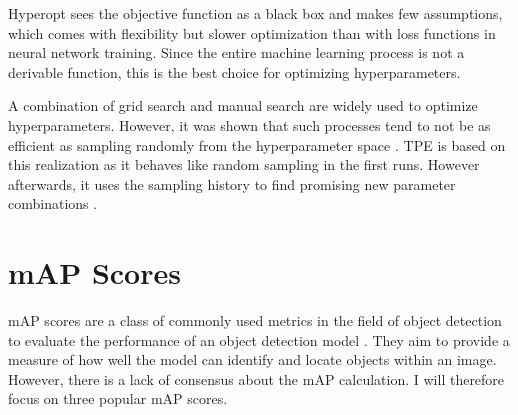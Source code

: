 \documentclass[10pt]{book}
\begin{document}
Hyperopt sees the objective function as a black box and makes few assumptions, which comes with flexibility but slower optimization than with loss functions in neural network training. Since the entire machine learning process is not a derivable function, this is the best choice for optimizing hyperparameters.

A combination of grid search and manual search are widely used to optimize hyperparameters. However, it was shown that such processes tend to not be as efficient as sampling randomly from the hyperparameter space \cite{bergstra2012random}. \ac{TPE} is based on this realization as it behaves like random sampling in the first runs. However afterwards, it uses the sampling history to find promising new parameter combinations \cite{bergstra2011algorithms}. 



\section{mAP Scores}

\ac{mAP} scores are a class of commonly used metrics in the field of object detection to evaluate the performance of an object detection model \cite{padilla2020survey}. They aim to provide a measure of how well the model can identify and locate objects within an image. However, there is a lack of consensus about the \ac{mAP} calculation. I will therefore focus on three popular \ac{mAP} scores. 
\end{document}
